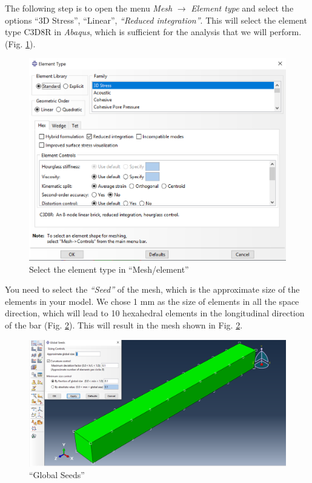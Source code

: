 \documentclass[spanish,a4paper,12pt]{article}
\begin{document}
The following step is to open the menu \emph{Mesh} $\to$ \emph{Element type} and select the options ``3D Stress'', ``Linear'', \emph{``Reduced integration''}. This will select the element type C3D8R in \emph{Abaqus}, which is sufficient for the analysis that we will perform. 
(Fig. \ref{fig:mesh-element}).
\begin{figure}[h!tp]
\centering
\includegraphics[scale=0.4]{capturas/31-mesh.png}
\caption{Select the element type in ``Mesh/element''}
\label{fig:mesh-element}%
\end{figure}

You need to select the  \emph{``Seed''} of the mesh, which is the approximate size of the elements in your model. We chose 1 mm as the size of elements in all the space direction, which will lead to 10 hexahedral elements in the longitudinal direction of the bar (Fig. \ref{fig:mesh1}). This will result in the mesh shown in Fig. \ref{fig:mesh1}.

\clearpage
\begin{figure}[h!tp]
\centering
\includegraphics[scale=0.4]{capturas/mesh1.png}
\caption{``Global Seeds''}
\label{fig:mesh1}%
\end{figure}
\end{document}

